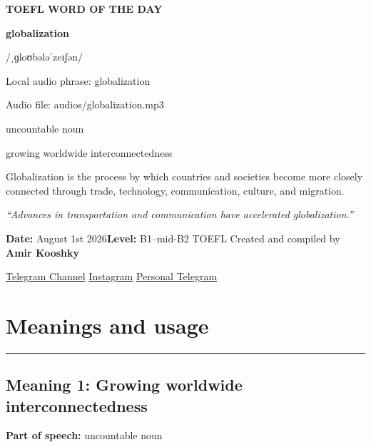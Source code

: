 \documentclass[11pt]{article}
\newcommand{\sectionrule}{\par\vspace{-0.5em}\noindent\textcolor{Accent}{\rule{\linewidth}{0.6pt}}\par}
\begin{document}
\begin{center}
{\sffamily\bfseries\color{Accent} TOEFL WORD OF THE DAY\par}
\vspace{8mm}
{\fontsize{42}{48}\selectfont\bfseries globalization\par}
\vspace{2mm}
{\Large\sffamily\color{Accent} /ˌɡloʊbələˈzeɪʃən/\par}
\vspace{2mm}
{\small\sffamily Local audio phrase: globalization\par}
{\small\sffamily Audio file: audios/globalization.mp3\par}
\vspace{2mm}
{\large\sffamily\color{Muted} uncountable noun\par}
\vspace{5mm}
{\sffamily growing worldwide interconnectedness\par}
\vspace{6mm}
{\large Globalization is the process by which countries and societies become more closely connected through trade, technology, communication, culture, and migration.\par}
\vspace{6mm}
\begin{minipage}{0.84\textwidth}
\itshape “Advances in transportation and communication have accelerated globalization.”
\end{minipage}\par
\vspace{10mm}
\textbf{Date:} August 1st 2026\quad\textbullet\quad \textbf{Level:} B1--mid-B2 TOEFL
\vfill
Created and compiled by \textbf{Amir Kooshky}\par
\vspace{2mm}
\href{https://t.me/KooshkyTOEFL}{Telegram Channel}\quad\textbullet\quad
\href{https://www.instagram.com/kooshkytoefl}{Instagram}\quad\textbullet\quad
\href{https://t.me/KooshkyTOEFL\_pv}{Personal Telegram}
\end{center}
\newpage
\tableofcontents
\newpage

\section{Meanings and usage}
\sectionrule
\subsection{Meaning 1: Growing worldwide interconnectedness}
\textbf{Part of speech:} uncountable noun
\end{document}

